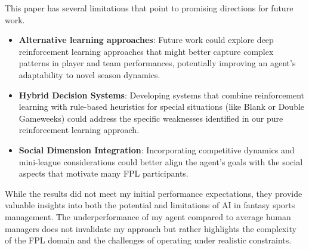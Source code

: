 This paper has several limitations that point to promising directions for future work. 

\begin{itemize}
    \item \textbf{Alternative learning approaches}: Future work could explore deep reinforcement learning approaches that might better capture complex patterns in player and team performances, potentially improving an agent's adaptability to novel season dynamics.
    \item \textbf{Hybrid Decision Systems}: Developing systems that combine reinforcement learning with rule-based heuristics for special situations (like Blank or Double Gameweeks) could address the specific weaknesses identified in our pure reinforcement learning approach.
    \item \textbf{Social Dimension Integration}: Incorporating competitive dynamics and \\mini-league considerations could better align the agent's goals with the social \\aspects that motivate many FPL participants.
\end{itemize}

While the results did not meet my initial performance expectations, they provide valuable insights into both the potential and limitations of AI in fantasy sports management. The underperformance of my agent compared to average human managers does not invalidate my approach but rather highlights the complexity of the FPL domain and the challenges of operating under realistic constraints.